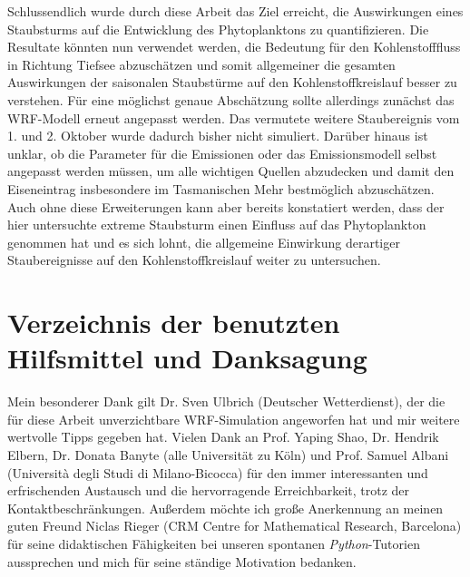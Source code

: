 \documentclass[12pt,a4paper,onecolumn,headheight=30pt]{scrartcl}
\begin{document}
Schlussendlich wurde durch diese Arbeit das Ziel erreicht, die Auswirkungen eines Staubsturms auf die Entwicklung des Phytoplanktons zu quantifizieren. Die Resultate könnten nun verwendet werden, die Bedeutung für den Kohlenstofffluss in Richtung Tiefsee abzuschätzen und somit allgemeiner die gesamten Auswirkungen der saisonalen Staubstürme auf den Kohlenstoffkreislauf besser zu verstehen. Für eine möglichst genaue Abschätzung sollte allerdings zunächst das WRF-Modell erneut angepasst werden. Das vermutete weitere Staubereignis vom 1. und 2. Oktober wurde dadurch bisher nicht simuliert. Darüber hinaus ist unklar, ob die Parameter für die Emissionen oder das Emissionsmodell selbst angepasst werden müssen, um alle wichtigen Quellen abzudecken und damit den Eiseneintrag insbesondere im Tasmanischen Mehr bestmöglich abzuschätzen. Auch ohne diese Erweiterungen kann aber bereits konstatiert werden, dass der hier untersuchte extreme Staubsturm einen Einfluss auf das Phytoplankton genommen hat und es sich lohnt, die allgemeine Einwirkung derartiger Staubereignisse auf den Kohlenstoffkreislauf weiter zu untersuchen.

\newpage
\printbibliography
\appendix

\newpage
\section{Verzeichnis der benutzten Hilfsmittel und Danksagung}
Mein besonderer Dank gilt Dr. Sven Ulbrich (Deutscher Wetterdienst), der die für diese Arbeit unverzichtbare WRF-Simulation \glqq angeworfen\grqq{} hat und mir weitere wertvolle Tipps gegeben hat. Vielen Dank an Prof. Yaping Shao, Dr. Hendrik Elbern, Dr. Donata Banyte (alle Universität zu Köln) und Prof. Samuel Albani (Università degli Studi di Milano-Bicocca) für den immer interessanten und erfrischenden Austausch und die hervorragende Erreichbarkeit, trotz der Kontaktbeschränkungen. Außerdem möchte ich große Anerkennung an meinen guten Freund Niclas Rieger (CRM Centre for Mathematical Research, Barcelona) für seine didaktischen Fähigkeiten bei unseren spontanen \textit{Python}-Tutorien aussprechen und mich für seine ständige Motivation bedanken.\\
\end{document}
